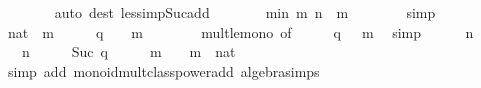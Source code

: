 \begin{isabellebody}
\ \ \ \ \ \ \isamarkupfalse%
\ {\isacharparenleft}{\kern0pt}auto\ dest{\isacharcolon}{\kern0pt}\ less{\isacharunderscore}{\kern0pt}imp{\isacharunderscore}{\kern0pt}Suc{\isacharunderscore}{\kern0pt}add{\isacharparenright}{\kern0pt}\isanewline
\ \ \ \ \isamarkupfalse%
\ \isamarkupfalse%
\ {\isacartoucheopen}min\ m\ n\ {\isacharequal}{\kern0pt}\ m{\isacartoucheclose}\isanewline
\ \ \ \ \ \ \isamarkupfalse%
\ simp\isanewline
\ \ \ \ \isamarkupfalse%
\ \isamarkupfalse%
\ {\isacartoucheopen}{\isacharparenleft}{\kern0pt}{}{\isacharcolon}{\kern0pt}{\isacharcolon}{\kern0pt}nat{\isacharparenright}{\kern0pt}\ {\isacharcircum}{\kern0pt}\ m\ {\isasymle}\ {}\ {\isacharasterisk}{\kern0pt}\ {}\ {\isacharcircum}{\kern0pt}\ q\ {\isacharasterisk}{\kern0pt}\ {}\ {\isacharcircum}{\kern0pt}\ m{\isacartoucheclose}\isanewline
\ \ \ \ \ \ \isamarkupfalse%
\ mult{\isacharunderscore}{\kern0pt}le{\isacharunderscore}{\kern0pt}mono{}\ {\isacharbrackleft}{\kern0pt}of\ {}\ {\isacartoucheopen}{}\ {\isacharasterisk}{\kern0pt}\ {}\ {\isacharcircum}{\kern0pt}\ q{\isacartoucheclose}\ {\isacartoucheopen}{}\ {\isacharcircum}{\kern0pt}\ m{\isacartoucheclose}{\isacharbrackright}{\kern0pt}\ \isamarkupfalse%
\ simp\isanewline
\ \ \ \ \isamarkupfalse%
\ n\ \isamarkupfalse%
\ {\isacartoucheopen}{}\ {\isacharcircum}{\kern0pt}\ n\ {\isacharminus}{\kern0pt}\ {}\ {\isacharequal}{\kern0pt}\ {\isacharparenleft}{\kern0pt}{}\ {\isacharcircum}{\kern0pt}\ Suc\ q\ {\isacharminus}{\kern0pt}\ {}{\isacharparenright}{\kern0pt}\ {\isacharasterisk}{\kern0pt}\ {}\ {\isacharcircum}{\kern0pt}\ m\ {\isacharplus}{\kern0pt}\ {\isacharparenleft}{\kern0pt}{}\ {\isacharcircum}{\kern0pt}\ m\ {\isacharminus}{\kern0pt}\ {\isacharparenleft}{\kern0pt}{}{\isacharcolon}{\kern0pt}{\isacharcolon}{\kern0pt}nat{\isacharparenright}{\kern0pt}{\isacharparenright}{\kern0pt}{\isacartoucheclose}\isanewline
\ \ \ \ \ \ \isamarkupfalse%
\ {\isacharparenleft}{\kern0pt}simp\ add{\isacharcolon}{\kern0pt}\ monoid{\isacharunderscore}{\kern0pt}mult{\isacharunderscore}{\kern0pt}class{\isachardot}{\kern0pt}power{\isacharunderscore}{\kern0pt}add\ algebra{\isacharunderscore}{\kern0pt}simps{\isacharparenright}{\kern0pt}\isanewline
\ \ \ \ \isamarkupfalse%
\ \isamarkupfalse%

\end{isabellebody}
